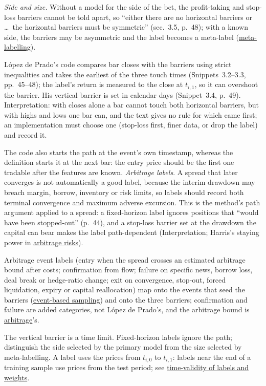 \begin{qfmethod}
\emph{Side and size.} Without a model for the side of the bet, the profit-taking and stop-loss barriers cannot be told apart, so ``either there are no horizontal barriers or \dots\ the horizontal barriers must be symmetric'' (sec.~3.5, p.~48); with a known side, the barriers may be asymmetric and the label becomes a meta-label (\hyperref[meth:meta-labelling]{meta-labelling}).

 López de Prado's code compares bar closes with the barriers using strict inequalities and takes the earliest of the three touch times (Snippets~3.2--3.3, pp.~45--48); the label's return is measured to the close at $t_{i,1}$, so it can overshoot the barrier. His vertical barrier is set in calendar days (Snippet~3.4, p.~49). Interpretation: with closes alone a bar cannot touch both horizontal barriers, but with highs and lows one bar can, and the text gives no rule for which came first; an implementation must choose one (stop-loss first, finer data, or drop the label) and record it.

The code also starts the path at the event's own timestamp, whereas the definition starts it at the next bar: the entry price should be the first one tradable after the features are known. \emph{Arbitrage labels}. A spread that later converges is not automatically a good label, because the interim drawdown may breach margin, borrow, inventory or risk limits, so labels should record both terminal convergence and maximum adverse excursion. This is the method's path argument applied to a spread: a fixed-horizon label ignores positions that ``would have been stopped-out'' (p.~44), and a stop-loss barrier set at the drawdown the capital can bear makes the label path-dependent (Interpretation; Harris's staying power in \hyperref[res:arbitrage-risks]{arbitrage risks}).

Arbitrage event labels (entry when the spread crosses an estimated arbitrage bound after costs; confirmation from flow; failure on specific news, borrow loss, deal break or hedge-ratio change; exit on convergence, stop-out, forced liquidation, expiry or capital reallocation) map onto the events that seed the barriers (\hyperref[meth:event-based-sampling]{event-based sampling}) and onto the three barriers; confirmation and failure are added categories, not López de Prado's, and the arbitrage bound is \hyperref[def:arbitrage]{arbitrage}'s.

 The vertical barrier is a time limit. Fixed-horizon labels ignore the path; distinguish the side selected by the primary model from the size selected by meta-labelling. A label uses the prices from $t_{i,0}$ to $t_{i,1}$: labels near the end of a training sample use prices from the test period; see \hyperref[pit:label-weight-leakage]{time-validity of labels and weights}.


\end{qfmethod}

